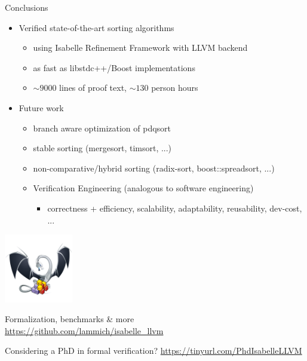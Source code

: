 \documentclass[fleqn]{beamer}
\begin{document}
\begin{frame}{Conclusions}
  \begin{itemize}
   \item Verified state-of-the-art sorting algorithms
    \begin{itemize}
     \item using Isabelle Refinement Framework with LLVM backend
     \item as fast as libstdc++/Boost implementations
     \item $\sim9000$ lines of proof text, $\sim130$ person hours
    \end{itemize}
   \item Future work
    \begin{itemize}
     \item branch aware optimization of pdqsort
     \item stable sorting (mergesort, timsort, ...)
     \item non-comparative/hybrid sorting (radix-sort, boost::spreadsort, ...)
      \medskip
     \item Verification Engineering (analogous to software engineering)
      \begin{itemize}
       \item {\color{green} correctness} + efficiency, scalability, adaptability, reusability, dev-cost, ...

      \end{itemize}
    \end{itemize}
  \end{itemize}
  \vfill

  \includegraphics[width=3cm,align=c]{isabelle-llvm.png}~~\begin{minipage}{.7\textwidth}
    \color{black}Formalization, benchmarks \& more\\
    \url{https://github.com/lammich/isabelle_llvm}
  \end{minipage}

  \vfill
  Considering a PhD in formal verification? \url{https://tinyurl.com/PhdIsabelleLLVM}

\end{frame}
\end{document}
